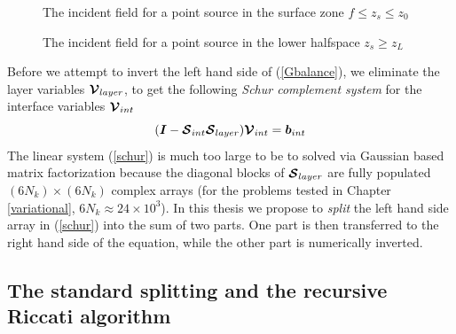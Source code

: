 \begin{figure}
\HideDisplacementBoxes
\centerline{}
\caption{The incident field for a point source in the surface zone $f\le 
z_s \le z_0$}
\protect\label{sourceS}
\end{figure}

\begin{figure}
\HideDisplacementBoxes
\centerline{}
\caption{The incident field for a point source in the lower halfspace
$z_s \ge z_L$}
\protect\label{sourceL}
\end{figure}





Before we attempt to invert the left hand side of (\ref{Gbalance}), we eliminate the 
layer variables ${\mbox{\boldmath$\cal V$\unboldmath}}_{{layer}}$, to get the following {\em Schur complement system\/} 
 for the interface variables ${\mbox{\boldmath$\cal V$\unboldmath}}_{{int}}$
\begin{equation} \label{schur}
({\mbox{\boldmath$\mit I$\unboldmath}}-{\mbox{\boldmath$\cal S$\unboldmath}}_{{int}}{\mbox{\boldmath$\cal S$\unboldmath}}_{{layer}}){\mbox{\boldmath$\cal V$\unboldmath}}_{{int}}={\mbox{\boldmath$\mit b$\unboldmath}}_{{int}}
\end{equation}
The linear system (\ref{schur}) is much too large to be to solved via 
Gaussian based matrix factorization because the diagonal blocks of ${\mbox{\boldmath$\cal S$\unboldmath}}_{{layer}}$ are fully populated  $(6 N_k) \times (6 N_k)$ complex arrays (for the 
problems tested in Chapter \ref{variational}, $6 N_k \approx 24\times 10^3$). 
In this thesis we propose to {\em split\/} the left hand side array in 
(\ref{schur}) into the sum of two parts. One part is then transferred to 
the right hand side of the equation, while the other part is numerically 
inverted.

\subsection{The standard splitting and the recursive Riccati algorithm}
\label{Riccati} 

